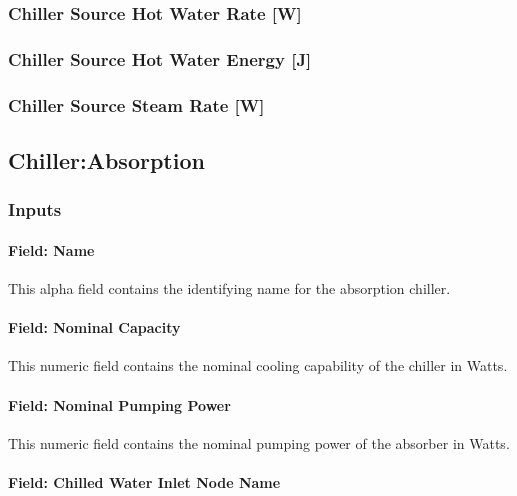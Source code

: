 \subsubsection{Chiller Source Hot Water Rate {[}W{]}}\label{chiller-source-hot-water-rate-w}

\subsubsection{Chiller Source Hot Water Energy {[}J{]}}\label{chiller-source-hot-water-energy-j}

\subsubsection{Chiller Source Steam Rate {[}W{]}}\label{chiller-source-steam-rate-w}

\subsection{Chiller:Absorption}\label{chillerabsorption}

\subsubsection{Inputs}\label{inputs-036}

\paragraph{Field: Name}\label{field-name-035}

This alpha field contains the identifying name for the absorption chiller.

\paragraph{Field: Nominal Capacity}\label{field-nominal-capacity-001}

This numeric field contains the nominal cooling capability of the chiller in Watts.

\paragraph{Field: Nominal Pumping Power}\label{field-nominal-pumping-power}

This numeric field contains the nominal pumping power of the absorber in Watts.

\paragraph{Field: Chilled Water Inlet Node Name}\label{field-chilled-water-inlet-node-name-000}

